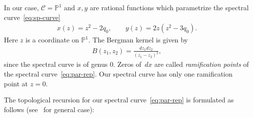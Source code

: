 \documentclass[11pt]{article}
\theoremstyle{definition}
\numberwithin{equation}{section}
\begin{document}
In our case, ${\mathcal C} = {\mathbb P}^1$ and $x, y$ are
rational functions which parametrize the spectral curve~\eqref{eq:sp-curve}
\begin{gather} \label{eq:par-rep}
x(z) = z^{2} - 2 q_{0}, \qquad
y(z) = 2z(z^{2} - 3q_{0}).
\end{gather}
Here $z$ is a coordinate on ${\mathbb P}^1$.
The Bergman kernel is given by
\begin{gather*}
B(z_1, z_2) = \frac{dz_{1}dz_{2}}{(z_{1}-z_{2})^{2}},
\end{gather*}
since the spectral curve is of genus $0$.
Zeros of~$dx$ are called {\em ramification points} of the
spectral curve~\eqref{eq:par-rep}.
Our spectral curve has only one ramif\/ication point at $z=0$.

The topological recursion for our spectral curve~\eqref{eq:par-rep}
is formulated as follows (see~\cite{EO07} for general case):
\end{document}
